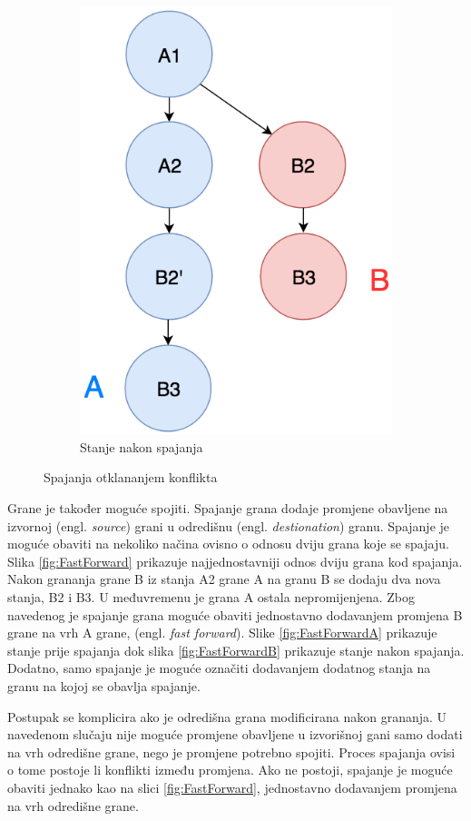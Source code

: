 \documentclass[times, utf8, diplomski, numeric]{fer}
\newcommand{\eng}[1]{(engl. \textit{#1})}
\begin{document}
\begin{figure}[b!]
\begin{subfigure}{.49\textwidth}
\centering
\includegraphics[scale=0.6]{ConflictB}
\caption{Stanje nakon spajanja}
\label{fig:ConflictB}
\end{subfigure}
\caption{Spajanja otklananjem konflikta}
\label{fig:Conflict}
\end{figure}

Grane je također moguće spojiti. Spajanje grana dodaje promjene obavljene na izvornoj \eng{source} grani u odredišnu \eng{destionation} granu. Spajanje je moguće obaviti na nekoliko načina ovisno o odnosu dviju grana koje se spajaju. Slika \ref{fig:FastForward} prikazuje najjednostavniji odnos dviju grana kod spajanja. Nakon grananja grane B iz stanja A2 grane A na granu B se dodaju dva nova stanja, B2 i B3. U međuvremenu je grana A ostala nepromijenjena. Zbog navedenog je spajanje grana moguće obaviti jednostavno dodavanjem promjena B grane na vrh A grane, \eng{fast forward}. Slike \ref{fig:FastForwardA} prikazuje stanje prije spajanja dok slika \ref{fig:FastForwardB} prikazuje stanje nakon spajanja. Dodatno, samo spajanje je moguće označiti dodavanjem dodatnog stanja na granu na kojoj se obavlja spajanje.

Postupak se komplicira ako je odredišna grana modificirana nakon grananja. U navedenom slučaju nije moguće promjene obavljene u izvorišnoj gani samo dodati na vrh odredišne grane, nego je promjene potrebno spojiti. Proces spajanja ovisi o tome postoje li konflikti između promjena. Ako ne postoji, spajanje je moguće obaviti jednako kao na slici \ref{fig:FastForward}, jednostavno dodavanjem promjena na vrh odredišne grane.
\end{document}
